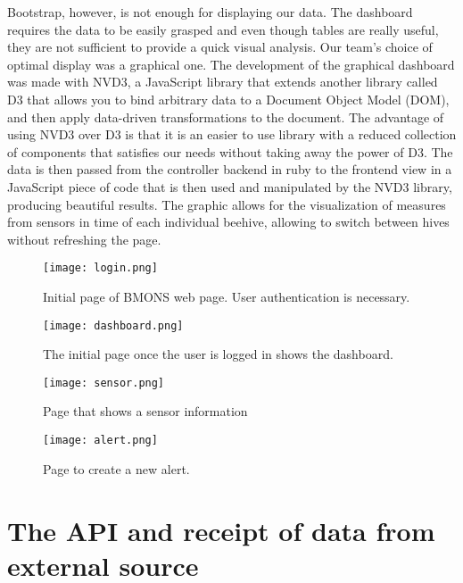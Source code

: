 Bootstrap, however, is not enough for displaying our data. The dashboard requires the data to be easily grasped and even though tables are really useful, they are not sufficient to provide a quick visual analysis. Our team's choice of optimal display was a graphical one. The development of the graphical dashboard was made with NVD3, a JavaScript library that extends another library called D3 that allows you to bind arbitrary data to a Document Object Model (DOM), and then apply data-driven transformations to the document. The advantage of using NVD3 over D3 is that it is an easier to use library with a reduced collection of components that satisfies our needs without taking away the power of D3. The data is then passed from the controller backend in ruby to the frontend view in a JavaScript piece of code that is then used and manipulated by the NVD3 library, producing beautiful results. The graphic allows for the visualization of measures from sensors in time of each individual beehive, allowing to switch between hives without refreshing the page. 

\begin{figure}[h]
\centering\texttt{[image: login.png]}
\caption{\label{fig:login} Initial page of BMONS web page. User authentication is necessary. }
\end{figure}

\begin{figure}[h]
\centering\texttt{[image: dashboard.png]}
\caption{\label{fig:dashboard} The initial page once the user is logged in shows the dashboard. }
\end{figure}

\begin{figure}[h]
\centering\texttt{[image: sensor.png]}
\caption{\label{fig:sensor} Page that shows a sensor information }
\end{figure}

\begin{figure}[h]
\centering\texttt{[image: alert.png]}
\caption{\label{fig:alert} Page to create a new alert. }
\end{figure}



\section{The API and receipt of data from external source}

